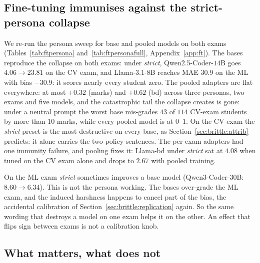 \subsection{Fine-tuning immunises against the strict-persona collapse}
\label{sec:finetune:personas}

  We re-run the persona sweep for base and pooled models on both exams (Tables~\ref{tab:ftpersona} and~\ref{tab:ftpersonafull}, Appendix~\ref{app:ft}). The bases reproduce the collapse on both exams: under
  \emph{strict}, Qwen2.5-Coder-$14$B goes $4.06 \to 23.81$ on the CV exam, and Llama-3.1-$8$B reaches MAE $30.9$ on the ML with bias $-30.9$: it scores nearly every student zero. The pooled adapters are flat everywhere: at most
  $+0.32$ (marks) and $+0.62$ (bd) across three personas, two exams and five models, and the catastrophic tail the collapse creates is gone: under a neutral prompt the worst base mis-grades $43$ of $114$ CV-exam students by more than
  $10$ marks, while every pooled model is at $0$--$1$. On the CV exam the \emph{strict} preset is the most destructive on every base, as Section~\ref{sec:brittle:attrib} predicts: it alone carries the two policy sentences. The per-exam adapters had one immunity failure, and pooling fixes it: Llama-bd under \emph{strict} sat at $4.08$ when tuned on the CV exam alone and drops to $2.67$ with pooled training.

  On the ML exam \emph{strict} sometimes improves a base model (Qwen3-Coder-$30$B: $8.60 \to 6.34$). This is not the persona working. The bases over-grade the ML exam, and the induced harshness happens to cancel part of the bias, the
  accidental calibration of Section~\ref{sec:brittle:replication} again. So the same wording that destroys a model on one exam helps it on the other. An effect that flips sign between exams is not a calibration knob.
  

\subsection{What matters, what does not}
\label{sec:finetune:choices}

